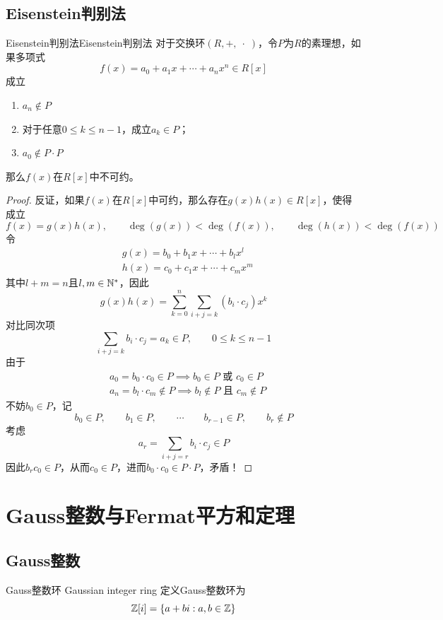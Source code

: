 \subsection{Eisenstein判别法}

\begin{theorem}{Eisenstein判别法}{Eisenstein判别法}
	对于交换环$(R,+,\;\cdot \;)$，令$P$为$R$的素理想，如果多项式%
	$$
	f(x)=a_0+a_1x+\cdots+a_nx^n\in R[x]
	$$
	成立
	\begin{enumerate}
		\item $a_n\notin P$
		\item 对于任意$0\le k \le n-1$，成立$a_k\in P$；
		\item $a_0\notin P\cdot P$
	\end{enumerate}
	那么$f(x)$在$R[x]$中不可约。
\end{theorem}

\begin{proof}
	反证，如果$f(x)$在$R[x]$中可约，那么存在$g(x)h(x)\in R[x]$，使得成立%
	$$
	f(x)=g(x)h(x),\qquad
	\deg(g(x))<\deg(f(x)),\qquad 
	\deg(h(x))<\deg(f(x))
	$$
	令
	\begin{align*}
		& g(x)=b_0+b_1x+\cdots+b_lx^l\\
		& h(x)=c_0+c_1x+\cdots+c_mx^m
	\end{align*}
	其中$l+m=n$且$l,m\in\mathbb{N}^*$，因此
	$$
	g(x)h(x)=\sum_{k=0}^{n}\sum_{i+j=k}(b_i\cdot c_j)x^k
	$$
	对比同次项
	$$
	\sum_{i+j=k}b_i\cdot c_j=a_k\in P,\qquad 0\le k \le n-1
	$$
	由于
	\begin{align*}
		& a_0=b_0\cdot c_0\in P\implies b_0\in P\text{ 或 }c_0\in P\\
		& a_n=b_l\cdot c_m\notin P\implies b_l\notin P\text{ 且 }c_m\notin P
	\end{align*}
	不妨$b_0\in P$，记%
	$$
	b_0\in P,\qquad
	b_1\in P,\qquad
	\cdots\qquad
	b_{r-1}\in P,\qquad
	b_r\notin P
	$$
	考虑%
	$$
	a_r=\sum_{i+j=r}b_i\cdot c_j\in P
	$$
	因此$b_rc_0\in P$，从而$c_0\in P$，进而$b_0\cdot c_0\in P\cdot P$，矛盾！
\end{proof}

\section{Gauss整数与Fermat平方和定理}

\subsection{Gauss整数}

\begin{definition}{Gauss整数环 Gaussian integer ring}
	定义Gauss整数环为
	$$
	\mathbb{Z}[i]=\{ a+bi:a,b\in\mathbb{Z} \}
	$$
\end{definition}

